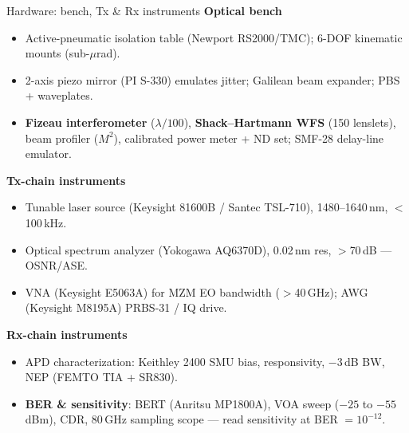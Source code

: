 \documentclass{KAIST-slide}
\newcommand{\si}{\item[\textcolor{islcorange}{\ding{167}}]}    %
\newcommand{\key}[1]{\textcolor{islcblue}{\textbf{#1}}}        %
\begin{document}
\begin{frame}[allowframebreaks=1.2]{Hardware: bench, Tx \& Rx instruments}
    \textbf{Optical bench}
    \begin{itemize}\footnotesize
        \si Active-pneumatic isolation table (Newport RS2000/TMC); 6-DOF kinematic mounts (sub-$\mu$rad).
        \si 2-axis piezo mirror (PI S-330) emulates jitter; Galilean beam expander; PBS + waveplates.
        \si \key{Fizeau interferometer} ($\lambda/100$), \key{Shack--Hartmann WFS} (150 lenslets), beam profiler ($M^2$), calibrated power meter + ND set; SMF-28 delay-line emulator.
    \end{itemize}
    \framebreak
    \textbf{Tx-chain instruments}
    \begin{itemize}\footnotesize
        \si Tunable laser source (Keysight 81600B / Santec TSL-710), 1480--1640\,nm, $<$100\,kHz.
        \si Optical spectrum analyzer (Yokogawa AQ6370D), 0.02\,nm res, $>$70\,dB --- OSNR/ASE.
        \si VNA (Keysight E5063A) for MZM EO bandwidth ($>$40\,GHz); AWG (Keysight M8195A) PRBS-31 / IQ drive.
    \end{itemize}
    \framebreak
    \textbf{Rx-chain instruments}
    \begin{itemize}\footnotesize
        \si APD characterization: Keithley 2400 SMU bias, responsivity, $-3$\,dB BW, NEP (FEMTO TIA + SR830).
        \si \key{BER \& sensitivity}: BERT (Anritsu MP1800A), VOA sweep ($-25$ to $-55$\,dBm), CDR, 80\,GHz sampling scope --- read sensitivity at BER $=10^{-12}$.
    \end{itemize}
\end{frame}
\end{document}
